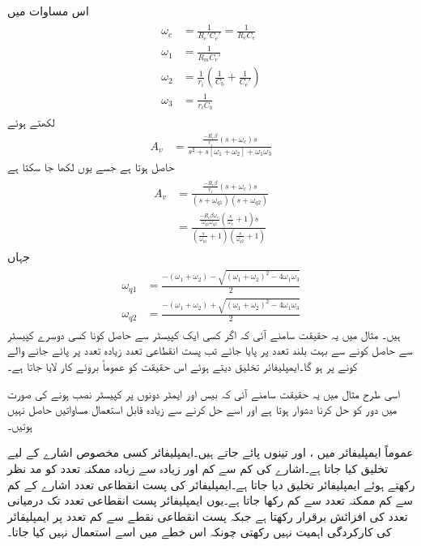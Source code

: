 اس مساوات میں
\begin{gather}
\begin{aligned}
\omega_c &=\frac{1}{R_e'  C_e' }=\frac{1}{R_e C_e}\\
\omega_1 &=\frac{1}{R_m C_e'}\\
\omega_2 &=\frac{1}{r_i} \left(\frac{1}{C_b}+\frac{1}{ C_e'} \right)\\
\omega_3 &=\frac{1}{r_i C_b}
\end{aligned}
\end{gather}
لکھتے ہوئے
\begin{align*}
A_v&=\frac{\frac{-R_c \beta}{r_i}\left(s+\omega_c\right) s}{s^2+s \left[\omega_1+\omega_2\right] +\omega_1 \omega_3}
\end{align*}
حاصل ہوتا ہے جسے یوں لکھا جا سکتا ہے
\begin{gather}
\begin{aligned}
A_v&=\frac{\frac{-R_c \beta}{r_i}\left(s+\omega_c\right) s}{\left(s+\omega_{q1} \right) \left(s+\omega_{q2} \right)}\\
&=\frac{\frac{-R_c \beta \omega_c}{\omega_{q1} \omega_{q2}} \left(\frac{s}{\omega_c}+1 \right) s}{\left(\frac{s}{\omega_{q1}}+1 \right)\left(\frac{s}{\omega_{q2}}+1 \right)}
\end{aligned}
\end{gather}
جہاں
\begin{gather}
\begin{aligned}
\omega_{q1}&= \frac{-\left(\omega_1+\omega_2 \right) - \sqrt{\left(\omega_1+\omega_2 \right)^2 -4 \omega_1 \omega_3}}{2}\\
\omega_{q2}&= \frac{-\left(\omega_1+\omega_2 \right) + \sqrt{\left(\omega_1+\omega_2 \right)^2 -4 \omega_1 \omega_3}}{2}
\end{aligned}
\end{gather}
ہیں۔
مثال  میں یہ حقیقت سامنے آئی کہ اگر کسی ایک کپیسٹر سے حاصل  کونا  کسی دوسرے کپیسٹر سے حاصل  کونے سے بہت بلند تعدد پر پایا جائے تب پست انقطاعی تعدد زیادہ تعدد پر پائے جانے والے کونے پر ہو گا۔ایمپلیفائر تخلیق دیتے ہوئے اس حقیقت کو عموماً بروئے کار لایا جاتا ہے۔

اسی طرح مثال  میں یہ حقیقت سامنے آئی کہ بیس  اور ایمٹر دونوں پر کپیسٹر نصب ہونے کی صورت میں دور کو حل کرنا دشوار ہوتا ہے اور اسے حل کرنے سے زیادہ قابل استعمال مساواتیں حاصل نہیں ہوتیں۔

عموماً ایمپلیفائر میں ،  اور  تینوں پائے جاتے ہیں۔ایمپلیفائر کسی مخصوص اشارے کے لیے تخلیق  کیا جاتا ہے۔اشارے کی کم سے کم اور زیادہ سے زیادہ ممکنہ تعدد کو مد نظر رکھتے ہوئے ایمپلیفائر تخلیق دیا جاتا ہے۔ایمپلیفائر کی پست انقطاعی تعدد اشارے کے کم سے کم ممکنہ تعدد سے کم رکھا جاتا ہے۔یوں ایمپلیفائر پست انقطاعی تعدد تک درمیانی تعدد کی افزائش برقرار رکھتا ہے جبکہ پست انقطاعی نقطے  سے کم تعدد پر ایمپلیفائر کی کارکردگی اہمیت نہیں رکھتی چونکہ اس خطے میں اسے استعمال نہیں کیا جاتا۔


